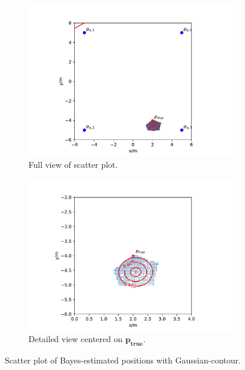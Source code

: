\documentclass{article}
\begin{document}
\begin{figure}[h]
\begin{subfigure}{\textwidth}
\centering
\includegraphics[width=\textwidth]{./figures/scenario3_gausscont_small_bayes.pdf}
\caption{Full view of scatter plot.}
\end{subfigure}

\begin{subfigure}{\textwidth}
\includegraphics[width=\textwidth]{./figures/scenario3_gausscont_big_bayes.pdf}
\caption{Detailed view centered on $\mathbf{p_{true}}$.}
\end{subfigure}
\caption{Scatter plot of Bayes-estimated positions with Gaussian-contour.}
\label{fig:scenario3_gausscont_bayes}
\end{figure}
\end{document}

